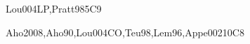 \begin{syllabus}
\begin{unit}{\PLProgramRepresentation}{}{Lou004LP,Pratt98}{5}{C9}
\begin{learningoutcomes}
	\item \PLProgramRepresentationLOExplainHowProcess [\Familiarity]
	\item \PLProgramRepresentationLODescribeAnTree [\Familiarity]
	\item \PLProgramRepresentationLODescribeTheHaving [\Familiarity]
	\item \PLProgramRepresentationLOWriteAProcess [\Familiarity]
	\item \PLRuntimeSystemsLOExplainTheMetadata [\Familiarity]
	\item \PLRuntimeSystemsLODiscussAdvantages [\Familiarity]
	\item \PLRuntimeSystemsLOIdentifyTheBy [\Familiarity]
\end{learningoutcomes}
\end{unit}

\begin{unit}{\PLLanguageTranslationandExecution}{}{Aho2008,Aho90,Lou004CO,Teu98,Lem96,Appe002}{10}{C8}
\begin{topics}%
	\item \PLLanguageTranslationandExecutionTopicInterpretation
	\item \PLLanguageTranslationandExecutionTopicLanguage
	\item \PLLanguageTranslationandExecutionTopicRun
	\item \PLLanguageTranslationandExecutionTopicRunTime
	\item \PLLanguageTranslationandExecutionTopicMemory
\end{topics}
\begin{learningoutcomes}
  
	\item \PLLanguageTranslationandExecutionLODistinguishA [\Assessment]
	\item \PLLanguageTranslationandExecutionLODistinguishSyntax [\Assessment]
	\item \PLLanguageTranslationandExecutionLOSketch [\Assessment]
	\item \PLLanguageTranslationandExecutionLOExplainHowImplementations [\Assessment]
	\item \PLLanguageTranslationandExecutionLOIdentifyAndLeaks [\Assessment]
	\item \PLLanguageTranslationandExecutionLODiscussTheLimitations [\Assessment]
\end{learningoutcomes}
\end{unit}


\end{syllabus}
